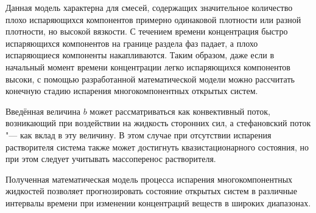 Данная модель характерна для смесей, содержащих значительное количество плохо испаряющихся компонентов примерно одинаковой плотности или разной плотности, но высокой вязкости. С течением времени концентрация быстро испаряющихся компонентов на границе раздела фаз падает, а плохо испаряющиеся компоненты накапливаются. Таким образом, даже если в начальный момент времени концентрации легко испаряющихся компонентов высоки, с помощью разработанной математической модели можно рассчитать конечную стадию испарения многокомпонентных открытых систем.

Введённая величина $b$ может рассматриваться как конвективный поток, возникающий при воздействии на жидкость сторонних сил, а стефановский поток "--- как вклад в эту величину. В этом случае при отсутствии испарения растворителя система также может достигнуть квазистационарного состояния, но при этом следует учитывать массоперенос растворителя. 

Полученная математическая модель процесса испарения многокомпонентных жидкостей позволяет прогнозировать состояние открытых систем в различные интервалы времени при изменении концентраций веществ в широких диапазонах.


